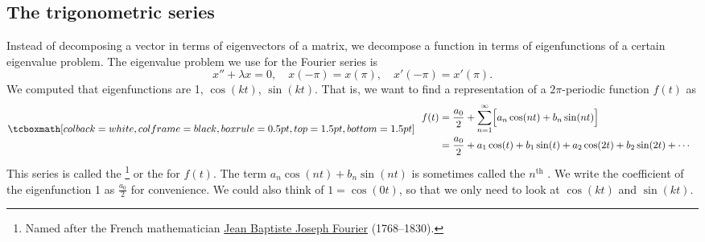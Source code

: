 \subsection{The trigonometric series}

Instead of decomposing a vector in terms of eigenvectors of a matrix,
we decompose a function in terms of eigenfunctions of a certain
eigenvalue problem.  The eigenvalue problem we use for
the Fourier series is 
\begin{equation*}
x'' + \lambda x = 0, \quad x(-\pi) = x(\pi), \quad x'(-\pi) = x'(\pi) .
\end{equation*}
We computed that eigenfunctions are 1, $\cos (k t)$,
$\sin (k t)$.  That is, we want to find a representation of a
$2\pi$-periodic function $f(t)$ as
\begin{equation*}
\mybxbg{~~
\begin{aligned}
f(t) &=
\frac{a_0}{2} +
\sum_{n=1}^\infty
\Bigl[ a_n \cos (n t) + b_n \sin (n t) \Bigr]
\\
& = 
\frac{a_0}{2}
+ a_1 \cos (t) + b_1 \sin (t) 
+ a_2 \cos (2 t) + b_2 \sin (2 t) 
+ \cdots
\end{aligned}
~~}
\end{equation*}
This series is called the \emph{}%
\footnote{Named after the French mathematician
\href{https://en.wikipedia.org/wiki/Joseph_Fourier}{Jean Baptiste Joseph Fourier}
(1768--1830).} or the
\emph{} for $f(t)$.
The term
$a_n \cos (n t) + b_n \sin (n t)$ is
sometimes called the $n^{\text{th}}$ \emph{}.
We write the coefficient of the eigenfunction 1 as $\frac{a_0}{2}$
for convenience.
We could also think of $1 = \cos (0t)$, so that
we only need to look at $\cos (kt)$ and $\sin (kt)$.

